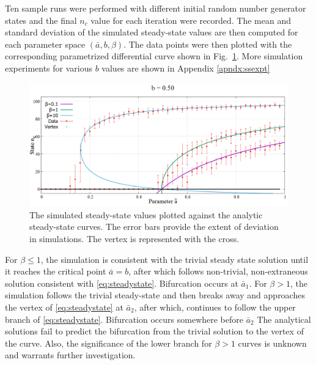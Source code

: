Ten sample runs were performed with different initial random number generator states and the final $n_{c}$ value for each iteration were recorded.
The mean and standard deviation of the simulated steady-state values are then computed for each parameter space $(\bar{a},b,\beta)$. 
The data points were then plotted with the corresponding parametrized differential curve shown in Fig.~\ref{fig:phase+sim}.
More simulation experiments for various $b$ values are shown in Appendix \ref{apndx:ssexpt}

\begin{figure}[h!]
 \centering
  \includegraphics[width=\linewidth]{images/chapter3/phase+sim.png}
  \caption{The simulated steady-state values plotted against the analytic steady-state curves. The error bars provide the extent of deviation in simulations. The vertex is represented with the cross.}
  \label{fig:phase+sim}
\end{figure}

For $\beta \leq 1$, the simulation is consistent with the trivial steady state solution until it reaches the critical point $\bar{a} = b$, after which follows non-trivial, non-extraneous solution consistent with \eqref{eq:steadystate}.
Bifurcation occurs at $\bar{a}_1$.
For $\beta > 1$, the simulation follows the trivial steady-state and then breaks away and approaches the vertex of \eqref{eq:steadystate} at $\bar{a}_{2}$, after which, continues to follow the upper branch of \eqref{eq:steadystate}.
Bifurcation occurs somewhere before $\bar{a}_2$
The analytical solutions fail to predict the bifurcation from the trivial solution to the vertex of the curve.
Also, the significance of the lower branch for $\beta > 1$ curves is unknown and warrants further investigation.


